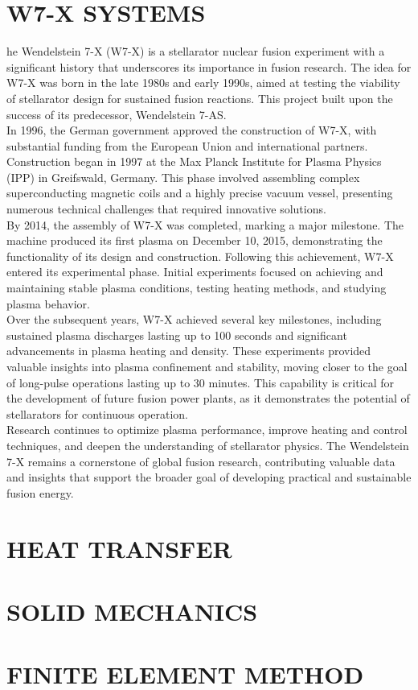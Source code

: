\section{W7-X SYSTEMS}
\normalsize{he Wendelstein 7-X (W7-X) is a stellarator nuclear fusion experiment with a significant history that underscores its importance in fusion research. The idea for W7-X was born in the late 1980s and early 1990s, aimed at testing the viability of stellarator design for sustained fusion reactions. This project built upon the success of its predecessor, Wendelstein 7-AS.}
\\
\break
\normalsize{\indent In 1996, the German government approved the construction of W7-X, with substantial funding from the European Union and international partners. Construction began in 1997 at the Max Planck Institute for Plasma Physics (IPP) in Greifswald, Germany. This phase involved assembling complex superconducting magnetic coils and a highly precise vacuum vessel, presenting numerous technical challenges that required innovative solutions.}
\\
\break
\normalsize{\indent By 2014, the assembly of W7-X was completed, marking a major milestone. The machine produced its first plasma on December 10, 2015, demonstrating the functionality of its design and construction. Following this achievement, W7-X entered its experimental phase. Initial experiments focused on achieving and maintaining stable plasma conditions, testing heating methods, and studying plasma behavior.}
\\
\break
\normalsize{\indent Over the subsequent years, W7-X achieved several key milestones, including sustained plasma discharges lasting up to 100 seconds and significant advancements in plasma heating and density. These experiments provided valuable insights into plasma confinement and stability, moving closer to the goal of long-pulse operations lasting up to 30 minutes. This capability is critical for the development of future fusion power plants, as it demonstrates the potential of stellarators for continuous operation.}
\\
\break
\normalsize{\indent Research continues to optimize plasma performance, improve heating and control techniques, and deepen the understanding of stellarator physics. The Wendelstein 7-X remains a cornerstone of global fusion research, contributing valuable data and insights that support the broader goal of developing practical and sustainable fusion energy.}
\\
\section{HEAT TRANSFER}


\section{SOLID MECHANICS}

\section{FINITE ELEMENT METHOD}

